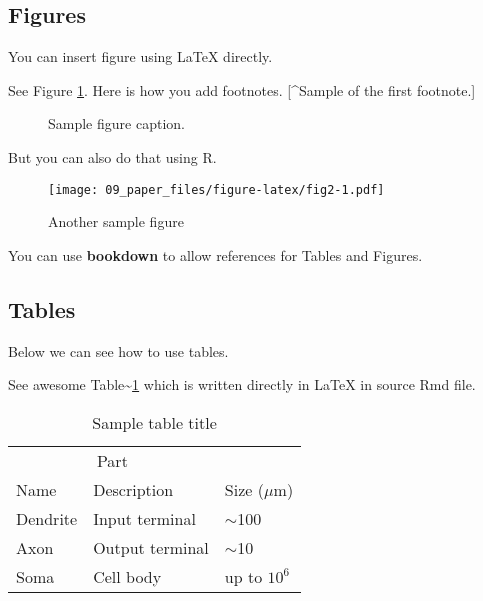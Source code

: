 \documentclass{article}
\newenvironment{Shaded}{\begin{snugshade}}{\end{snugshade}}
\newcommand{\FunctionTok}[1]{\textcolor[rgb]{0.00,0.00,0.00}{#1}}
\newcommand{\NormalTok}[1]{#1}
\newcommand{\SpecialCharTok}[1]{\textcolor[rgb]{0.00,0.00,0.00}{#1}}
\begin{document}
\hypertarget{figures}{%
\subsection{Figures}\label{figures}}

You can insert figure using LaTeX directly.

See Figure \ref{fig:fig1}. Here is how you add footnotes. {[}\^{}Sample
of the first footnote.{]}

\begin{figure}
  \centering
  \fbox{\rule[-.5cm]{4cm}{4cm} \rule[-.5cm]{4cm}{0cm}}
  \caption{Sample figure caption.}
  \label{fig:fig1}
\end{figure}

But you can also do that using R.

\begin{Shaded}
\end{Shaded}

\begin{figure}
\centering
\texttt{[image: 09\_paper\_files/figure-latex/fig2-1.pdf]}
\caption{Another sample figure}
\end{figure}

You can use \textbf{bookdown} to allow references for Tables and
Figures.

\hypertarget{tables}{%
\subsection{Tables}\label{tables}}

Below we can see how to use tables.

See awesome Table\textasciitilde{}\ref{tab:table} which is written
directly in LaTeX in source Rmd file.

\begin{table}
 \caption{Sample table title}
  \centering
  \begin{tabular}{lll}
    \toprule
    \multicolumn{2}{c}{Part}                   \\
    \cmidrule(r){1-2}
    Name     & Description     & Size ($\mu$m) \\
    \midrule
    Dendrite & Input terminal  & $\sim$100     \\
    Axon     & Output terminal & $\sim$10      \\
    Soma     & Cell body       & up to $10^6$  \\
    \bottomrule
  \end{tabular}
  \label{tab:table}
\end{table}
\end{document}
